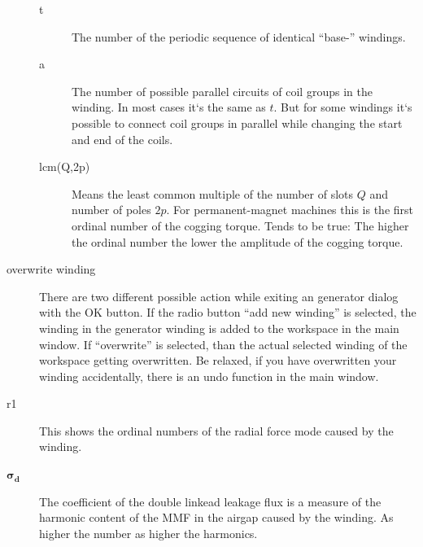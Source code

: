 \documentclass[]{scrreprt}
\begin{document}
\begin{description}
\begin{description}
    \item[t] The number of the periodic sequence of identical ``base-'' windings. 
    \item[a] The number of possible parallel circuits of coil groups in the winding. In most 
            cases it`s the same as $t$. But for some windings it`s possible to connect
            coil groups in parallel while changing the start and end of the coils.
    \item[lcm(Q,2p)] Means the least common multiple of the number of slots $Q$ and number
            of poles $2p$. For permanent-magnet machines this is the first ordinal
            number of the cogging torque. Tends to be true: The higher the ordinal number the lower the amplitude of the cogging torque.
    \end{description}
  \item[overwrite winding] There are two different possible action while exiting an generator dialog with
          the OK button. If the radio button "`add new winding"' is selected, the winding in the generator
          winding is added to the workspace in the main window. If "`overwrite"' is selected, than the 
          actual selected winding of the workspace getting overwritten. Be relaxed, if you have overwritten
          your winding accidentally, there is an undo function in the main window.
 \item[r1] This shows the ordinal numbers of the radial force mode caused by the winding.
 \item[$\boldsymbol{\sigma_d}$]  The coefficient of the double linkead leakage flux is
          a measure of the harmonic content of the MMF in the airgap caused by the winding. 
          As higher the number as higher the harmonics.
\end{description}
%
%
%
\end{document}
